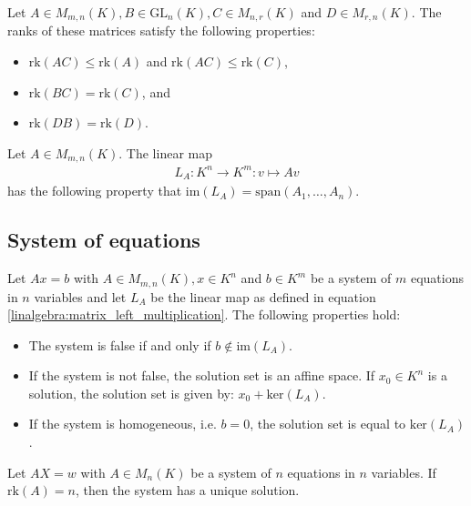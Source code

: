     \begin{property}\label{linalgebra:rank_properties}
        Let $A\in M_{m,n}(K),B\in\text{GL}_n(K),C\in M_{n,r}(K)$ and $D\in M_{r,n}(K)$. The ranks of these matrices satisfy the following properties:
        \begin{itemize}
            \item $\text{rk}(AC)\leq\text{rk}(A)$ and $\text{rk}(AC)\leq\text{rk}(C)$,
            \item $\text{rk}(BC)=\text{rk}(C)$, and
            \item $\text{rk}(DB)=\text{rk}(D)$.
        \end{itemize}
    \end{property}
    \begin{property}\label{linalgebra:dim_matrix_left_multiplication}
        Let $A\in M_{m,n}(K)$. The linear map
        \begin{gather}
            \label{linalgebra:matrix_left_multiplication}
            L_A:K^n\rightarrow K^m:v\mapsto Av
        \end{gather}
        has the following property that $\text{im}(L_A) = \text{span}(A_1,\ldots,A_n)$.
    \end{property}

\subsection{System of equations}\label{section:system_of_equations}

    \begin{property}\label{linalgebra:matrix_and_equations}
        Let $Ax=b$ with $A\in M_{m,n}(K),x\in K^n$ and $b\in K^m$ be a system of $m$ equations in $n$ variables and let $L_A$ be the linear map as defined in equation \eqref{linalgebra:matrix_left_multiplication}. The following properties hold:
        \begin{itemize}
            \item The system is false if and only if $b\not\in\text{im}(L_A)$.
            \item If the system is not false, the solution set is an affine space. If $x_0\in K^n$ is a solution, the solution set is given by: $x_0+\text{ker}(L_A)$.
            \item If the system is homogeneous, i.e. $b=0$, the solution set is equal to $\text{ker}(L_A)$.
        \end{itemize}
    \end{property}
    \begin{property}[Uniqueness]\label{linalgebra:rank_unique_solution}
        Let $AX=w$ with $A\in M_n(K)$ be a system of $n$ equations in $n$ variables. If $\text{rk}(A)=n$, then the system has a unique solution.
    \end{property}

